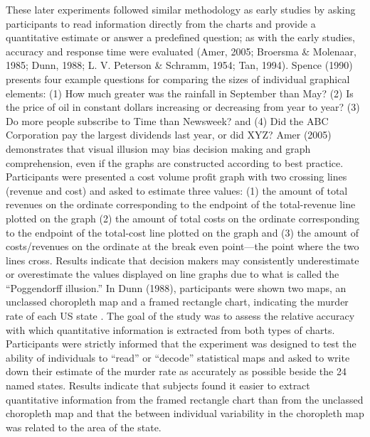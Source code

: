 \documentclass[print]{nuthesis}
\begin{document}
These later experiments followed similar methodology as early studies by asking participants to read information directly from the charts and provide a quantitative estimate or answer a predefined question; as with the early studies, accuracy and response time were evaluated (Amer, 2005; Broersma \& Molenaar, 1985; Dunn, 1988; L. V. Peterson \& Schramm, 1954; Tan, 1994).
Spence (1990) presents four example questions for comparing the sizes of individual graphical elements: (1) How much greater was the rainfall in September than May? (2) Is the price of oil in constant dollars increasing or decreasing from year to year? (3) Do more people subscribe to Time than Newsweek? and (4) Did the ABC Corporation pay the largest dividends last year, or did XYZ?
Amer (2005) demonstrates that visual illusion may bias decision making and graph comprehension, even if the graphs are constructed according to best practice.
Participants were presented a cost volume profit graph  with two crossing lines (revenue and cost) and asked to estimate three values: (1) the amount of total revenues on the ordinate corresponding to the endpoint of the total-revenue line plotted on the graph (2) the amount of total costs on the ordinate corresponding to the endpoint of the total-cost line plotted on the graph and (3) the amount of costs/revenues on the ordinate at the break even point---the point where the two lines cross.
Results indicate that decision makers may consistently underestimate or overestimate the values displayed on line graphs due to what is called the ``Poggendorff illusion.''
In Dunn (1988), participants were shown two maps, an unclassed choropleth map and a framed rectangle chart, indicating the murder rate of each US state .
The goal of the study was to assess the relative accuracy with which quantitative information is extracted from both types of charts.
Participants were strictly informed that the experiment was designed to test the ability of individuals to ``read'' or ``decode'' statistical maps and asked to write down their estimate of the murder rate as accurately as possible beside the 24 named states.
Results indicate that subjects found it easier to extract quantitative information from the framed rectangle chart than from the unclassed choropleth map and that the between individual variability in the choropleth map was related to the area of the state.
\end{document}
